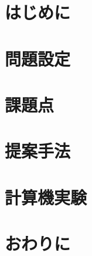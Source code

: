 \documentclass[10pt]{../../sty/jskbook}
\begin{document}
    \maketitle
    \clearpage

    \chapter{はじめに}
    

    \chapter{問題設定}
    

    \chapter{課題点}
    

    \chapter{提案手法}
    

    \chapter{計算機実験}
    

    \chapter{おわりに}
    

    
    
\end{document}
